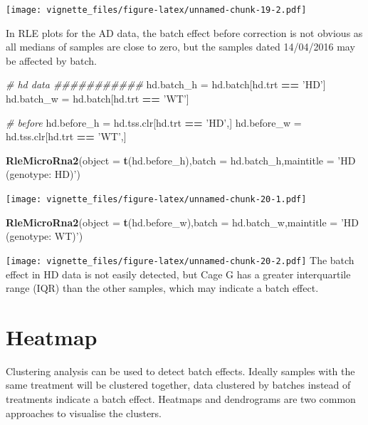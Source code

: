 \documentclass[]{book}
\newenvironment{Shaded}{\begin{snugshade}}{\end{snugshade}}
\newcommand{\KeywordTok}[1]{\textcolor[rgb]{0.13,0.29,0.53}{\textbf{#1}}}
\newcommand{\DataTypeTok}[1]{\textcolor[rgb]{0.13,0.29,0.53}{#1}}
\newcommand{\StringTok}[1]{\textcolor[rgb]{0.31,0.60,0.02}{#1}}
\newcommand{\CommentTok}[1]{\textcolor[rgb]{0.56,0.35,0.01}{\textit{#1}}}
\newcommand{\OperatorTok}[1]{\textcolor[rgb]{0.81,0.36,0.00}{\textbf{#1}}}
\newcommand{\NormalTok}[1]{#1}
\begin{document}
\texttt{[image: vignette\_files/figure-latex/unnamed-chunk-19-2.pdf]}

In RLE plots for the AD data, the batch effect before correction is not
obvious as all medians of samples are close to zero, but the samples
dated 14/04/2016 may be affected by batch.

\begin{Shaded}
\begin{Highlighting}[]
\CommentTok{# hd data ###########}
\NormalTok{hd.batch_h =}\StringTok{ }\NormalTok{hd.batch[hd.trt }\OperatorTok{==}\StringTok{ 'HD'}\NormalTok{]}
\NormalTok{hd.batch_w =}\StringTok{ }\NormalTok{hd.batch[hd.trt }\OperatorTok{==}\StringTok{ 'WT'}\NormalTok{] }

\CommentTok{# before}
\NormalTok{hd.before_h =}\StringTok{ }\NormalTok{hd.tss.clr[hd.trt }\OperatorTok{==}\StringTok{ 'HD'}\NormalTok{,]}
\NormalTok{hd.before_w =}\StringTok{ }\NormalTok{hd.tss.clr[hd.trt }\OperatorTok{==}\StringTok{ 'WT'}\NormalTok{,]}

\KeywordTok{RleMicroRna2}\NormalTok{(}\DataTypeTok{object =} \KeywordTok{t}\NormalTok{(hd.before_h),}\DataTypeTok{batch =}\NormalTok{ hd.batch_h,}\DataTypeTok{maintitle =} \StringTok{'HD (genotype: HD)'}\NormalTok{)}
\end{Highlighting}
\end{Shaded}

\texttt{[image: vignette\_files/figure-latex/unnamed-chunk-20-1.pdf]}

\begin{Shaded}
\begin{Highlighting}[]
\KeywordTok{RleMicroRna2}\NormalTok{(}\DataTypeTok{object =} \KeywordTok{t}\NormalTok{(hd.before_w),}\DataTypeTok{batch =}\NormalTok{ hd.batch_w,}\DataTypeTok{maintitle =} \StringTok{'HD (genotype: WT)'}\NormalTok{)}
\end{Highlighting}
\end{Shaded}

\texttt{[image: vignette\_files/figure-latex/unnamed-chunk-20-2.pdf]} The
batch effect in HD data is not easily detected, but Cage G has a greater
interquartile range (IQR) than the other samples, which may indicate a
batch effect.

\section{Heatmap}\label{heatmap}

Clustering analysis can be used to detect batch effects. Ideally samples
with the same treatment will be clustered together, data clustered by
batches instead of treatments indicate a batch effect. Heatmaps and
dendrograms are two common approaches to visualise the clusters.
\end{document}
